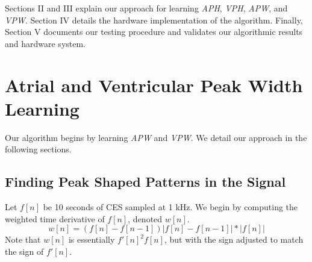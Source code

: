 \documentclass[conference]{IEEEtran}
\newcommand{\APW}{\textit{APW}}
\newcommand{\VPW}{\textit{VPW}}
\newcommand{\APH}{\textit{APH}}
\newcommand{\VPH}{\textit{VPH}}
\begin{document}
Sections II and III explain our approach
for learning \APH{}, \VPH{}, \APW{}, and \VPW{}. Section IV
details the hardware implementation of the algorithm.
Finally, Section V documents our testing procedure and
validates our algorithmic results and hardware system.

\section{Atrial and Ventricular Peak Width Learning}
Our algorithm begins by learning \APW{} and \VPW{}. We
detail our approach in the following sections.

\subsection{Finding Peak Shaped Patterns in the Signal}
Let $f[n]$ be 10 seconds of CES sampled at 1 kHz.
We begin by computing the weighted time
derivative of $f[n]$, denoted $w[n]$.
\begin{equation*}
	w[n]=(f[n]-f[n-1])\left|f[n] - f[n-1]\right| * \left|f[n]\right|
\end{equation*}
Note that $w[n]$ is essentially $f'[n]^2  f[n]$, but with the sign adjusted to match the sign of $f'[n]$. %
\end{document}
